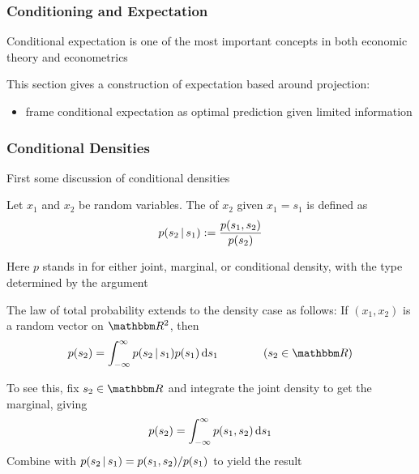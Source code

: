 \begin{frame}\frametitle{Conditioning and Expectation}

    \vspace{2em}
    Conditional expectation is one of the most important concepts in
    both economic theory and econometrics
    
    This section gives a construction of 
    expectation based around projection:
    
    \begin{itemize}
        \item frame conditional expectation as optimal
        prediction given limited information
    \end{itemize}

\end{frame}

\begin{frame}\frametitle{Conditional Densities}

    \vspace{2em}
    First some discussion of conditional densities 
    
    Let $x_1$ and $x_2$ be random variables.  The  
    of $x_2$ given $x_1 = s_1$ is defined as 
    \begin{equation*}
        p(s_2 \, | \, s_1) 
            := \frac{p(s_1, s_2)}{p(s_2)}
    \end{equation*}
    
    Here $p$ stands in for either joint, marginal, or conditional density, 
    with the type determined by the argument
    
\end{frame}

\begin{frame}

    \vspace{2em}
    The law of total probability extends to the
    density case as follows: If $(x_1, x_2)$ is a random vector on $\RR^2$, then
    \begin{equation*}
        \label{eq:dltp}
        p(s_2)
        = \int_{-\infty}^{\infty} p(s_2 \given s_1) p(s_1) \diff s_1
        \qquad \qquad 
        (s_2 \in \RR)
    \end{equation*}
    
    \Prf 
    To see this, fix $s_2 \in \RR$ and integrate the joint density to get the marginal, giving
    $$
        p(s_2) = \int_{-\infty}^{\infty} p(s_1, s_2) \mathop{}\!\mathrm{d} s_1
    $$
    Combine with $p(s_2 \, | \, s_1) = p(s_1, s_2)/p(s_1)$ to yield the result
    
\end{frame}

